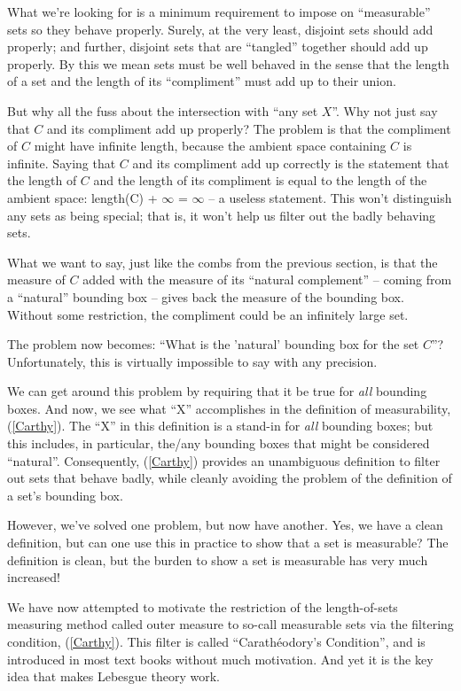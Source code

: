 \documentclass{article}
\begin{document}
What we're looking for is a minimum requirement to impose on ``measurable'' sets
so they behave properly. Surely, at the very least, disjoint sets
should add properly; and further, disjoint sets that are ``tangled'' together
should add up properly.
By this we mean sets must be well behaved
in the sense that the length of a set and the length of its ``compliment'' 
must add up to their union. 

But why all the fuss about the intersection with ``any set $X$''.
Why not just say that $C$ and its compliment add up properly?
The problem is that the compliment of $C$ might have infinite length, because
the ambient space containing $C$ is infinite.
Saying that $C$ and its compliment add up correctly is the statement that 
the length of $C$ and the length of its compliment is equal to the length 
of the ambient space: length(C) + $\infty$ = $\infty$ -- a useless statement.
This won't distinguish any sets as being special; that is, it won't help
us filter out the badly behaving sets.

What we want to say, just like the combs from the
previous section, is that the measure of $C$ added with the measure of its 
``natural complement'' -- coming from a ``natural'' bounding box -- 
gives back the measure of the bounding box.
Without some restriction, the compliment could be 
an infinitely large set.

The problem now becomes: ``What is the 'natural' bounding box for the set $C$''?
Unfortunately, this is virtually impossible to say with any precision.

We can get around this problem by requiring that it be true for {\em all\/} 
bounding boxes. And now, we see what ``X'' accomplishes in the definition of 
measurability, (\ref{Carthy}). The ``X'' in this definition is a stand-in for 
{\em all\/} bounding boxes; but this includes, in particular, the/any 
bounding boxes that might be considered ``natural''. 
Consequently, (\ref{Carthy}) provides an unambiguous definition to filter out 
sets that behave badly, while cleanly avoiding 
the problem of the definition of a set's bounding box.

However, we've solved one problem, but now have another. Yes, we have 
a clean definition, but can one use this in practice to show that a 
set is measurable? The definition is clean, but the burden to show a set is
measurable has very much increased!

We have now attempted to motivate the restriction of the length-of-sets 
measuring method called outer measure to so-call measurable sets via 
the filtering condition, (\ref{Carthy}).
This filter is called ``Carath\'eodory's Condition'',
and is introduced in most text books without much motivation. 
And yet it is the key idea that makes Lebesgue theory work. 
 
\end{document}
